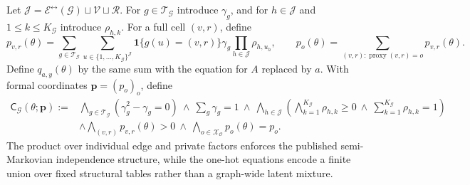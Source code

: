 Let \(\mathcal J=\mathcal E^{\leftrightarrow}(\mathcal G)\sqcup\mathcal V\sqcup\mathcal R\). For \(g\in\mathcal T_{\mathcal G}\) introduce \(\gamma_g\), and for \(h\in\mathcal J\) and \(1\leq k\leq K_{\mathcal G}\) introduce \(\rho_{h,k}\). For a full cell \((v,r)\), define \[p_{v,r}(\theta)=\sum_{g\in\mathcal T_{\mathcal G}}\sum_{u\in\{1,\ldots,K_{\mathcal G}\}^{\mathcal J}}\mathbf 1\{g(u)=(v,r)\}\gamma_g\prod_{h\in\mathcal J}\rho_{h,u_h},\qquad p_o(\theta)=\sum_{(v,r):\operatorname{proxy}(v,r)=o}p_{v,r}(\theta).\] Define \(q_{a,y}(\theta)\) by the same sum with the equation for \(A\) replaced by \(a\). With formal coordinates \(\mathbf p=(p_o)_o\), define \[\begin{aligned}\mathsf C_{\mathcal G}(\theta;\mathbf p):={}&\bigwedge_{g\in\mathcal T_{\mathcal G}}(\gamma_g^2-\gamma_g=0)\ \wedge\ \sum_g\gamma_g=1\ \wedge\ \bigwedge_{h\in\mathcal J}\left(\bigwedge_{k=1}^{K_{\mathcal G}}\rho_{h,k}\geq0\ \wedge\ \sum_{k=1}^{K_{\mathcal G}}\rho_{h,k}=1\right)\\&\wedge\bigwedge_{(v,r)}p_{v,r}(\theta)>0\ \wedge\ \bigwedge_{o\in\mathcal X_{\mathcal O}}p_o(\theta)=p_o.\end{aligned}\] The product over individual edge and private factors enforces the published semi-Markovian independence structure, while the one-hot equations encode a finite union over fixed structural tables rather than a graph-wide latent mixture.